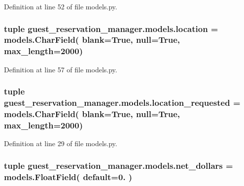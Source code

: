 Definition at line 52 of file models.\-py.

\hypertarget{namespaceguest__reservation__manager_1_1models_aeae418e0c45c5e6ff43d38064f5766cc}{
\subsubsection[{location}]{\setlength{\rightskip}{0pt plus 5cm}tuple guest\-\_\-reservation\-\_\-manager.\-models.\-location = models.\-Char\-Field( blank=True, null=True, max\-\_\-length=2000)}}\label{namespaceguest__reservation__manager_1_1models_aeae418e0c45c5e6ff43d38064f5766cc}


Definition at line 57 of file models.\-py.

\hypertarget{namespaceguest__reservation__manager_1_1models_a5c5ee49f53b737443ad2b5089427d726}{
\subsubsection[{location\-\_\-requested}]{\setlength{\rightskip}{0pt plus 5cm}tuple guest\-\_\-reservation\-\_\-manager.\-models.\-location\-\_\-requested = models.\-Char\-Field( blank=True, null=True, max\-\_\-length=2000)}}\label{namespaceguest__reservation__manager_1_1models_a5c5ee49f53b737443ad2b5089427d726}


Definition at line 29 of file models.\-py.

\hypertarget{namespaceguest__reservation__manager_1_1models_ae72debea279da55366fe8cb3d4a6bf2c}{
\subsubsection[{net\-\_\-dollars}]{\setlength{\rightskip}{0pt plus 5cm}tuple guest\-\_\-reservation\-\_\-manager.\-models.\-net\-\_\-dollars = models.\-Float\-Field( default=0. )}}\label{namespaceguest__reservation__manager_1_1models_ae72debea279da55366fe8cb3d4a6bf2c}


